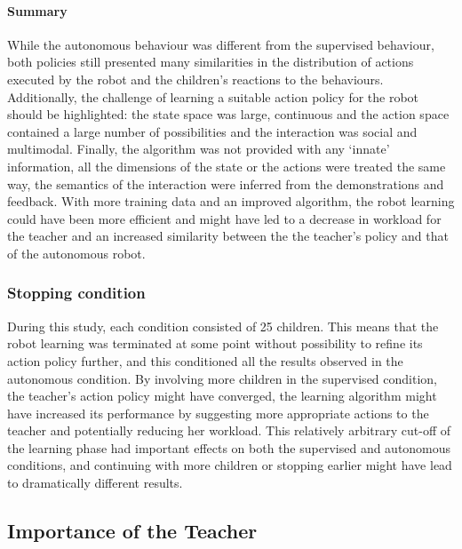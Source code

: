 \paragraph{Summary}

While the autonomous behaviour was different from the supervised behaviour, both policies still presented many similarities in the distribution of actions executed by the robot and the children's reactions to the behaviours. Additionally, the challenge of learning a suitable action policy for the robot should be highlighted: the state space was large, continuous and the action space contained a large number of possibilities and the interaction was social and multimodal. Finally, the algorithm was not provided with any `innate' information, all the dimensions of the state or the actions were treated the same way, the semantics of the interaction were inferred from the demonstrations and feedback. With more training data and an improved algorithm, the robot learning could have been more efficient and might have led to a decrease in workload for the teacher and an increased similarity between the the teacher's policy and that of the autonomous robot. 


\subsubsection{Stopping condition}

During this study, each condition consisted of 25 children. This means that the robot learning was terminated at some point without possibility to refine its action policy further, and this conditioned all the results observed in the autonomous condition. By involving more children in the supervised condition, the teacher's action policy might have converged, the learning algorithm might have increased its performance by suggesting more appropriate actions to the teacher and potentially reducing her workload. This relatively arbitrary cut-off of the learning phase had important effects on both the supervised and autonomous conditions, and continuing with more children or stopping earlier might have lead to dramatically different results.

\subsection{Importance of the Teacher}

